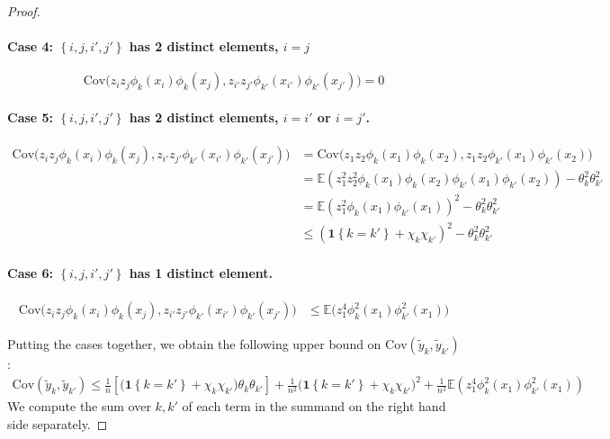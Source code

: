 \documentclass{article}
\newcommand{\set}[1]{\left\{#1\right\}}
\newcommand{\Cov}{\mathrm{Cov}}
\newcommand{\1}{\mathbb{I}}
\newcommand{\Ebb}{\mathbb{E}}
\theoremstyle{alden}
\theoremstyle{aldenthm}
\theoremstyle{definition}
\theoremstyle{remark}
\begin{document}
\begin{proof}
	\paragraph{Case 4: $\set{i,j,i',j'}$ has 2 distinct elements, $i = j$}
	$$
	\Cov\bigl(z_iz_j\phi_k(x_i)\phi_k(x_j), z_{i'}z_{j'}\phi_{k'}(x_{i'})\phi_{k'}(x_{j'})\bigr) = 0
	$$
	
	\paragraph{Case 5: $\set{i,j,i',j'}$ has 2 distinct elements, $i = i'$ or $i = j'$.}
	\begin{align*}
	\Cov\bigl(z_iz_j\phi_k(x_i)\phi_k(x_j), z_{i'}z_{j'}\phi_{k'}(x_{i'})\phi_{k'}(x_{j'})\bigr) & = \Cov\bigl( z_1z_2\phi_k(x_1)\phi_k(x_2), z_1z_2\phi_{k'}(x_1)\phi_{k'}(x_2) \bigr) \\
	& = \Ebb(z_1^2 z_2^2 \phi_k(x_1) \phi_k(x_2) \phi_{k'}(x_1) \phi_{k'}(x_2)) - \theta_k^2 \theta_{k'}^2 \\
	& = \Ebb(z_1^2 \phi_k(x_1) \phi_{k'}(x_1))^2 - \theta_k^2 \theta_{k'}^2 \\
	& \leq \left(\mathbf{1}\set{k = k'} + \chi_k \chi_{k'} \right)^2 - \theta_k^2 \theta_{k'}^2
	\end{align*}
	
	\paragraph{Case 6: $\set{i,j,i',j'}$ has 1 distinct element.}
	\begin{align*}
	\Cov\bigl(z_iz_j\phi_k(x_i)\phi_k(x_j), z_{i'}z_{j'}\phi_{k'}(x_{i'})\phi_{k'}(x_{j'})\bigr) & \leq \Ebb\bigl(z_1^4 \phi_k^2(x_1) \phi_{k'}^2(x_1)\bigr)
	\end{align*}
	
	Putting the cases together, we obtain the following upper bound on $\Cov(\widetilde{y}_k, \widetilde{y}_{k'})$:
	\begin{align*}
	\Cov(\widetilde{y}_k, \widetilde{y}_{k'}) \leq \frac{1}{n} \left[\bigl(\mathbf{1}\set{k = k'} + \chi_k \chi_{k'}\bigr)\theta_k\theta_{k'}\right] + \frac{1}{n^2} \bigl(\mathbf{1}\set{k = k'} + \chi_k \chi_{k'}\bigr)^2 + \frac{1}{n^3} \Ebb(z_1^4 \phi_k^2(x_1) \phi_{k'}^2(x_1))
	\end{align*}
	We compute the sum over $k,k'$ of each term in the summand on the right hand side separately. 
	

\end{proof}
\end{document}
